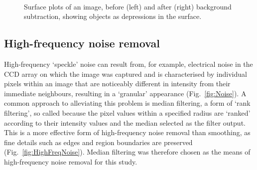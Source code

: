 \begin{figure}[tb]
	\centering
	\hspace{1.5cm}
	\\
	\hspace{0.5cm}
  \caption{Surface plots of an image, before (left) and after (right) background subtraction, showing objects as depressions in the surface.}
  \label{fig:PelletSurfacePlot}\end{figure}

\subsection{High-frequency noise removal}

High-frequency \lq speckle' noise can result from, for example, electrical noise in the CCD array on which the image was captured and is characterised by individual pixels within an image that are noticeably different in intensity from their immediate neighbours, resulting in a \lq granular' appearance (Fig.~\ref{fig:Noise}). A common approach to alleviating this problem is median filtering, a form of \lq rank filtering', so called because the pixel values within a specified radius are \lq ranked' according to their intensity values and the median selected as the filter output. This is a more effective form of high-frequency noise removal than smoothing, as fine details such as edges and region boundaries are preserved (Fig.~\ref{fig:HighFreqNoise}). Median filtering was therefore chosen as the means of high-frequency noise removal for this study.

